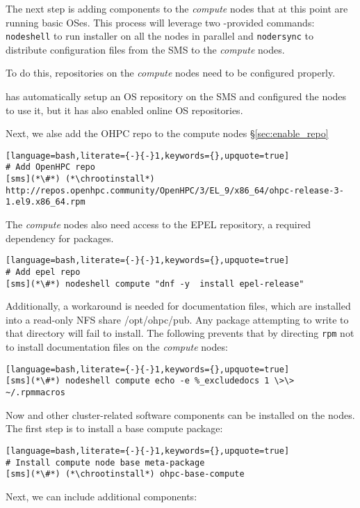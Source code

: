 
The next step is adding \OHPC{} components to the {\em compute} nodes that at this
point are running basic OSes.  This process will leverage two \Confluent{}-provided
commands: \texttt{nodeshell} to run \texttt{\pkgmgr{}} installer on all the
nodes in parallel  and \texttt{nodersync} to distribute configuration files from the
SMS to the {\em compute} nodes.

\noindent To do this, repositories on the {\em compute} nodes need to be configured
properly.

\Confluent{} has automatically setup an  OS repository on the SMS and configured the
nodes to use it, but it has  also enabled online OS repositories.


\noindent Next, we alse add the OHPC repo to the compute nodes \S\ref{sec:enable_repo}

\begin{lstlisting}[language=bash,literate={-}{-}1,keywords={},upquote=true]
# Add OpenHPC repo 
[sms](*\#*) (*\chrootinstall*) http://repos.openhpc.community/OpenHPC/3/EL_9/x86_64/ohpc-release-3-1.el9.x86_64.rpm
\end{lstlisting}

The {\em compute} nodes also need access to the EPEL repository, a required
dependency for \OHPC{} packages. 

\begin{lstlisting}[language=bash,literate={-}{-}1,keywords={},upquote=true]
# Add epel repo
[sms](*\#*) nodeshell compute "dnf -y  install epel-release"

\end{lstlisting}


\noindent Additionally, a workaround is needed for \OHPC{} documentation files,
which are installed into a read-only NFS share /opt/ohpc/pub. Any package
attempting to write to that directory will fail to install. The following
prevents that by directing \texttt{rpm} not to install documentation files on
the {\em compute} nodes:

\begin{lstlisting}[language=bash,literate={-}{-}1,keywords={},upquote=true]
[sms](*\#*) nodeshell compute echo -e %_excludedocs 1 \>\> ~/.rpmmacros
\end{lstlisting}

\noindent Now \OHPC{} and other cluster-related software components can be
installed on the nodes. The first step is to install a base compute package:
\begin{lstlisting}[language=bash,literate={-}{-}1,keywords={},upquote=true]
# Install compute node base meta-package
[sms](*\#*) (*\chrootinstall*) ohpc-base-compute
\end{lstlisting}

\noindent Next, we can include additional components:
